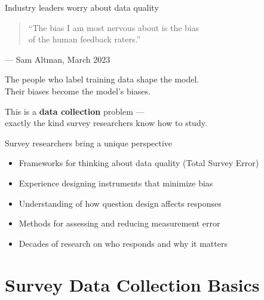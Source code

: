 \documentclass[aspectratio=169,11pt]{beamer}
\begin{document}
\begin{frame}{Industry leaders worry about data quality}

\begin{quote}
``The bias I am most nervous about is the bias\\
of the human feedback raters.''
\end{quote}

\vspace{0.5em}
\hfill --- Sam Altman, March 2023

\vspace{1.5em}

The people who label training data shape the model.\\
Their biases become the model's biases.

\vspace{1em}

This is a \textbf{data collection} problem ---\\
exactly the kind survey researchers know how to study.
\end{frame}

\begin{frame}{Survey researchers bring a unique perspective}
\begin{itemize}
  \item Frameworks for thinking about data quality (Total Survey Error)
  \item Experience designing instruments that minimize bias
  \item Understanding of how question design affects responses
  \item Methods for assessing and reducing measurement error
  \item Decades of research on who responds and why it matters
\end{itemize}
\end{frame}


\section{Survey Data Collection Basics}
\end{document}
